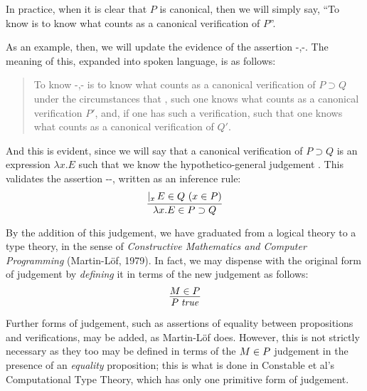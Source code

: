 \documentclass[main.tex]{subfiles}
\begin{document}
In practice, when it is clear that $P$ is canonical, then we will simply say,
``To know  is to know what counts as a canonical verification of
$P$''.

As an example, then, we will update the evidence of the assertion
\hyp{}{,\hyp{}{}}. The meaning
of this, expanded into spoken language, is as follows:
\begin{quote}
  To know \hyp{}{,\hyp{}{}} is
  to know what counts as a canonical verification of $P\supset Q$ under
  the circumstances that , such one knows what counts as a
  canonical verification $P'$, and, if one has such a verification,
   such that one knows what counts as a canonical verification of
  $Q'$.
\end{quote}

And this is evident, since we will say that a canonical verification of
$P\supset Q$ is an expression $\lambda x. E$ such that we know the
hypothetico-general judgement . This
validates the assertion \hyp{}{\hyp{}{}}, written as an inference rule:
%
\[
  \infer{
    \ver{\lambda x.E}{P\supset Q}
  }{
    \genj{x}{\hyp{\ver{E}{Q}}{\ver{x}{P}}}
  }
\]

By the addition of this judgement, we have graduated from a logical theory to a
type theory, in the sense of \emph{Constructive Mathematics and Computer
Programming} (Martin-L\"of, 1979). In fact, we may dispense with the original
 form of judgement by \emph{defining} it in terms of the new
 judgement as follows:
\[
  \infer{
    \istrue{P}
  }{
    \ver{M}{P}
  }
\]

Further forms of judgement, such as assertions of equality between propositions
and verifications, may be added, as Martin-L\"of does. However, this is not
strictly necessary as they too may be defined in terms of the $M\in P$
judgement in the presence of an \emph{equality} proposition; this is what is
done in Constable et al's Computational Type Theory, which has only one
primitive form of judgement.
\end{document}
